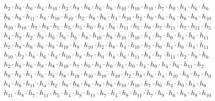 \[
\begin{aligned}
& h_{2} \cdot h_{8} \cdot h_{6} \cdot h_{4} \cdot h_{10} \cdot h_{2} \cdot h_{8} \cdot h_{6} \cdot h_{6} \cdot h_{8} \cdot h_{10} \cdot h_{10} \cdot h_{10} \cdot h_{7} \cdot h_{0} \cdot h_{4} \cdot h_{6} \cdot h_{6} \\ &
h_{6} \cdot h_{6} \cdot h_{11} \cdot h_{8} \cdot h_{10} \cdot h_{10} \cdot h_{2} \cdot h_{8} \cdot h_{6} \cdot h_{4} \cdot h_{10} \cdot h_{2} \cdot h_{8} \cdot h_{6} \cdot h_{6} \cdot h_{6} \cdot h_{8} \cdot h_{10} \\ &
h_{10} \cdot h_{10} \cdot h_{7} \cdot h_{3} \cdot h_{5} \cdot h_{5} \cdot h_{5} \cdot h_{0} \cdot h_{4} \cdot h_{6} \cdot h_{11} \cdot h_{5} \cdot h_{9} \cdot h_{7} \cdot h_{11} \cdot h_{7} \cdot h_{11} \cdot h_{5} \\ &
h_{4} \cdot h_{9} \cdot h_{2} \cdot h_{8} \cdot h_{6} \cdot h_{6} \cdot h_{6} \cdot h_{8} \cdot h_{10} \cdot h_{8} \cdot h_{10} \cdot h_{10} \cdot h_{4} \cdot h_{7} \cdot h_{0} \cdot h_{4} \cdot h_{6} \cdot h_{11} \\ &
h_{2} \cdot h_{8} \cdot h_{6} \cdot h_{6} \cdot h_{8} \cdot h_{10} \cdot h_{8} \cdot h_{10} \cdot h_{2} \cdot h_{8} \cdot h_{4} \cdot h_{10} \cdot h_{7} \cdot h_{0} \cdot h_{4} \cdot h_{6} \cdot h_{4} \cdot h_{11} \\ &
h_{10} \cdot h_{2} \cdot h_{8} \cdot h_{6} \cdot h_{4} \cdot h_{10} \cdot h_{8} \cdot h_{7} \cdot h_{0} \cdot h_{4} \cdot h_{6} \cdot h_{11} \cdot h_{4} \cdot h_{7} \cdot h_{11} \cdot h_{2} \cdot h_{8} \cdot h_{6} \\ &
h_{2} \cdot h_{8} \cdot h_{6} \cdot h_{8} \cdot h_{8} \cdot h_{10} \cdot h_{7} \cdot h_{0} \cdot h_{4} \cdot h_{0} \cdot h_{4} \cdot h_{0} \cdot h_{4} \cdot h_{0} \cdot h_{4} \cdot h_{6} \cdot h_{11} \cdot h_{2} \\ &
h_{8} \cdot h_{6} \cdot h_{4} \cdot h_{6} \cdot h_{8} \cdot h_{8} \cdot h_{10} \cdot h_{10} \cdot h_{10} \cdot h_{10} \cdot h_{2} \cdot h_{8} \cdot h_{6} \cdot h_{4} \cdot h_{10} \cdot h_{8} \cdot h_{7} \cdot h_{0} \\ &
h_{4} \cdot h_{6} \cdot h_{11} \cdot h_{4} \cdot h_{2} \cdot h_{8} \cdot h_{6} \cdot h_{6} \cdot h_{8} \cdot h_{8} \cdot h_{10} \cdot h_{10} \cdot h_{7} \cdot h_{0} \cdot h_{4} \cdot h_{0} \cdot h_{4} \cdot h_{6} \\ &
h_{11} \cdot h_{8} \cdot h_{7} \cdot h_{11} \cdot h_{5} \cdot h_{4} \cdot h_{8} \cdot h_{11} \cdot h_{7} \cdot h_{4} \cdot h_{8} \cdot h_{11} \cdot h_{7} \cdot h_{9} \cdot h_{6} \cdot h_{8} \cdot h_{8} \cdot h_{10} \\ &

\end{aligned}\]
